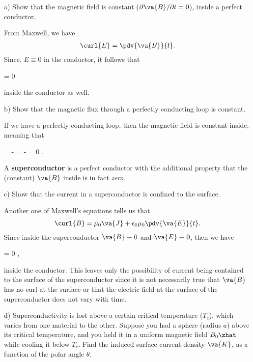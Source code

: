 \documentclass[12pt,a4paper]{article}
\begin{document}
a) Show that the magnetic field is constant ($\partial \va{B} / \partial t = 0$), inside a perfect conductor.

From Maxwell, we have
\begin{align*}
    \curl{E} = \pdv{\va{B}}{t}
.\end{align*}
Since, $E \equiv 0$ in the conductor, it follows that
\begin{eqbox}
     = 0
\end{eqbox}
inside the conductor as well.

b) Show that the magnetic flux through a perfectly conducting loop is constant.

If we have a perfectly conducting loop, then the magnetic field is constant inside, meaning that 
\begin{eqbox}
     = - = - \int {} \vdot {} = 0
.\end{eqbox}

A \textbf{superconductor} is a perfect conductor with the additional property that the (constant) $\va{B}$ inside is in fact \textit{zero}.

c) Show that the current in a superconductor is confined to the surface.

Another one of Maxwell's equations tells us that 
\begin{align*}
    \curl{B} = \mu_0 \va{J} + \epsilon_0 \mu_0 \pdv{\va{E}}{t}
.\end{align*}
Since inside the superconductor $\va{B} \equiv 0$ and $\va{E} \equiv 0$, then we have
\begin{eqbox}
     = 0
,\end{eqbox}
inside the conductor.
This leaves only the possibility of current being contained to the surface of the superconductor since it is not necessarily true that $\va{B}$ has no curl at the surface or that the electric field at the surface of the superconductor does not vary with time.

d) Superconductivity is lost above a certain critical temperature ($T_{c}$), which varies from one material to the other.
Suppose you had a sphere (radius $a$) above its critical temperature, and you held it in a uniform magnetic field $B_0 \zhat$ while cooling it below $T_{c}$.
Find the induced surface current density $\va{K}$, as a function of the polar angle $\theta$.
\end{document}
